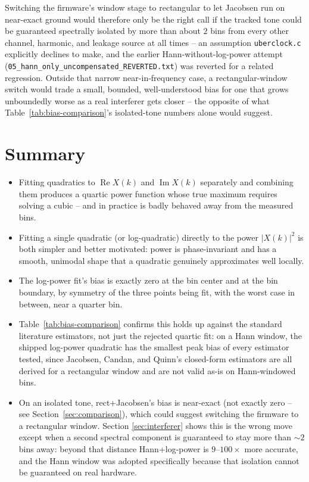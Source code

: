 \documentclass[11pt]{article}
\begin{document}
Switching the firmware's window stage to rectangular to let Jacobsen
run on near-exact ground would therefore only be the right call if the
tracked tone could be guaranteed spectrally isolated by more than
about $2$ bins from every other channel, harmonic, and leakage source
at all times -- an assumption \texttt{uberclock.c} explicitly declines
to make, and the earlier Hann-without-log-power attempt
(\texttt{05\_hann\_only\_uncompensated\_REVERTED.txt}) was reverted for
a related regression. Outside that narrow near-in-frequency case, a
rectangular-window switch would trade a small, bounded, well-understood
bias for one that grows unboundedly worse as a real interferer gets
closer -- the opposite of what Table~\ref{tab:bias-comparison}'s
isolated-tone numbers alone would suggest.

\section{Summary}

\begin{itemize}
  \item Fitting quadratics to $\operatorname{Re}X(k)$ and
        $\operatorname{Im}X(k)$ separately and combining them produces
        a quartic power function whose true maximum requires solving
        a cubic -- and in practice is badly behaved away from the
        measured bins.
  \item Fitting a single quadratic (or log-quadratic) directly to the
        power $|X(k)|^2$ is both simpler and better motivated: power
        is phase-invariant and has a smooth, unimodal shape that a
        quadratic genuinely approximates well locally.
  \item The log-power fit's bias is exactly zero at the bin center and
        at the bin boundary, by symmetry of the three points being
        fit, with the worst case in between, near a quarter bin.
  \item Table~\ref{tab:bias-comparison} confirms this holds up against
        the standard literature estimators, not just the rejected
        quartic fit: on a Hann window, the shipped log-power quadratic
        has the smallest peak bias of every estimator tested, since
        Jacobsen, Candan, and Quinn's closed-form estimators are all
        derived for a rectangular window and are not valid as-is on
        Hann-windowed bins.
  \item On an isolated tone, rect+Jacobsen's bias is near-exact (not
        exactly zero -- see Section~\ref{sec:comparison}), which could
        suggest switching the firmware to a rectangular window. Section
        \ref{sec:interferer} shows this is the wrong move except when a
        second spectral component is guaranteed to stay more than
        $\sim\!2$ bins away: beyond that distance Hann+log-power is
        $9$--$100\times$ more accurate, and the Hann window was adopted
        specifically because that isolation cannot be guaranteed on
        real hardware.
\end{itemize}
\end{document}
